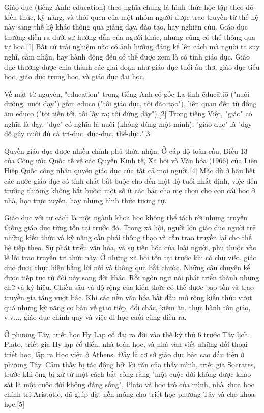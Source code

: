 \documentclass[../thesis.tex]{subfiles}
\begin{document}
Giáo dục (tiếng Anh: education) theo nghĩa chung là hình thức học tập theo đó kiến thức, kỹ năng, và thói quen của một nhóm người được trao truyền từ thế hệ này sang thế hệ khác thông qua giảng dạy, đào tạo, hay nghiên cứu. Giáo dục thường diễn ra dưới sự hướng dẫn của người khác, nhưng cũng có thể thông qua tự học.[1] Bất cứ trải nghiệm nào có ảnh hưởng đáng kể lên cách mà người ta suy nghĩ, cảm nhận, hay hành động đều có thể được xem là có tính giáo dục. Giáo dục thường được chia thành các giai đoạn như giáo dục tuổi ấu thơ, giáo dục tiểu học, giáo dục trung học, và giáo dục đại học.

Về mặt từ nguyên, "education" trong tiếng Anh có gốc La-tinh ēducātiō ("nuôi dưỡng, nuôi dạy") gồm ēdūcō ("tôi giáo dục, tôi đào tạo"), liên quan đến từ đồng âm ēdūcō ("tôi tiến tới, tôi lấy ra; tôi đứng dậy").[2] Trong tiếng Việt, "giáo" có nghĩa là dạy, "dục" có nghĩa là nuôi (không dùng một mình); "giáo dục" là "dạy dỗ gây nuôi đủ cả trí-dục, đức-dục, thể-dục."[3]

Quyền giáo dục được nhiều chính phủ thừa nhận. Ở cấp độ toàn cầu, Điều 13 của Công ước Quốc tế về các Quyền Kinh tế, Xã hội và Văn hóa (1966) của Liên Hiệp Quốc công nhận quyền giáo dục của tất cả mọi người.[4] Mặc dù ở hầu hết các nước giáo dục có tính chất bắt buộc cho đến một độ tuổi nhất định, việc đến trường thường không bắt buộc; một số ít các bậc cha mẹ chọn cho con cái học ở nhà, học trực tuyến, hay những hình thức tương tự.

Giáo dục với tư cách là một ngành khoa học không thể tách rời những truyền thống giáo dục từng tồn tại trước đó. Trong xã hội, người lớn giáo dục người trẻ những kiến thức và kỹ năng cần phải thông thạo và cần trao truyền lại cho thế hệ tiếp theo. Sự phát triển văn hóa, và sự tiến hóa của loài người, phụ thuộc vào lề lối trao truyền tri thức này. Ở những xã hội tồn tại trước khi có chữ viết, giáo dục được thực hiện bằng lời nói và thông qua bắt chước. Những câu chuyện kể được tiếp tục từ đời này sang đời khác. Rồi ngôn ngữ nói phát triển thành những chữ và ký hiệu. Chiều sâu và độ rộng của kiến thức có thể được bảo tồn và trao truyền gia tăng vượt bậc. Khi các nền văn hóa bắt đầu mở rộng kiến thức vượt quá những kỹ năng cơ bản về giao tiếp, đổi chác, kiếm ăn, thực hành tôn giáo, v.v..., giáo dục chính quy và việc đi học cuối cùng diễn ra.

Ở phương Tây, triết học Hy Lạp cổ đại ra đời vào thế kỷ thứ 6 trước Tây lịch. Plato, triết gia Hy lạp cổ điển, nhà toán học, và nhà văn viết những đối thoại triết học, lập ra Học viện ở Athens. Đây là cơ sở giáo dục bậc cao đầu tiên ở phương Tây. Cảm thấy bị tác động bởi lời răn của thầy mình, triết gia Socrates, trước khi ông bị xử tử một cách bất công rằng "một cuộc đời không được khảo sát là một cuộc đời không đáng sống", Plato và học trò của mình, nhà khoa học chính trị Aristotle, đã giúp đặt nền móng cho triết học phương Tây và cho khoa học.[5]
\end{document}
